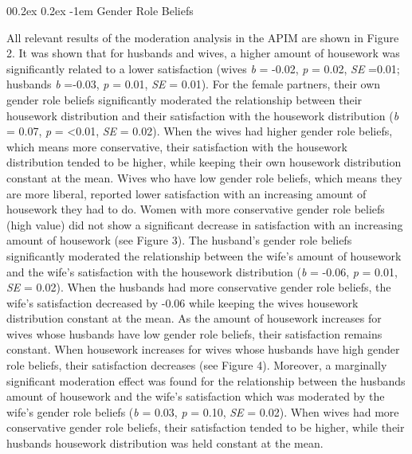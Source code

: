 \documentclass[
  man,floatsintext]{apa6}
\makeatletter
\let\oldparagraph\paragraph
\renewcommand{\paragraph}[1]{\oldparagraph{#1}\mbox{}}
\renewcommand{\paragraph}{\@startsection{paragraph}{4}{\parindent}%
  {0\baselineskip \@plus 0.2ex \@minus 0.2ex}%
  {-1em}%
  {\normalfont\normalsize\bfseries\itshape\typesectitle}}
\makeatother
\begin{document}
\hypertarget{gender-role-beliefs-1}{%
\paragraph{Gender Role Beliefs}\label{gender-role-beliefs-1}}

All relevant results of the moderation analysis in the APIM are shown in Figure 2. It was shown that for husbands and wives, a higher amount of housework was significantly related to a lower satisfaction (wives \emph{b} = -0.02, \emph{p} = 0.02, \emph{SE} =0.01; husbands \emph{b} =-0.03, \emph{p} = 0.01, \emph{SE} = 0.01).
For the female partners, their own gender role beliefs significantly moderated the relationship between their housework distribution and their satisfaction with the housework distribution (\emph{b} = 0.07, \emph{p} = \textless0.01, \emph{SE} = 0.02). When the wives had higher gender role beliefs, which means more conservative, their satisfaction with the housework distribution tended to be higher, while keeping their own housework distribution constant at the mean. Wives who have low gender role beliefs, which means they are more liberal, reported lower satisfaction with an increasing amount of housework they had to do. Women with more conservative gender role beliefs (high value) did not show a significant decrease in satisfaction with an increasing amount of housework (see Figure 3).
The husband's gender role beliefs significantly moderated the relationship between the wife's amount of housework and the wife's satisfaction with the housework distribution (\emph{b} = -0.06, \emph{p} = 0.01, \emph{SE} = 0.02). When the husbands had more conservative gender role beliefs, the wife's satisfaction decreased by -0.06 while keeping the wives housework distribution constant at the mean.
As the amount of housework increases for wives whose husbands have low gender role beliefs, their satisfaction remains constant. When housework increases for wives whose husbands have high gender role beliefs, their satisfaction decreases (see Figure 4).
Moreover, a marginally significant moderation effect was found for the relationship between the husbands amount of housework and the wife's satisfaction which was moderated by the wife's gender role beliefs (\emph{b} = 0.03, \emph{p} = 0.10, \emph{SE} = 0.02). When wives had more conservative gender role beliefs, their satisfaction tended to be higher, while their husbands housework distribution was held constant at the mean.
\end{document}
